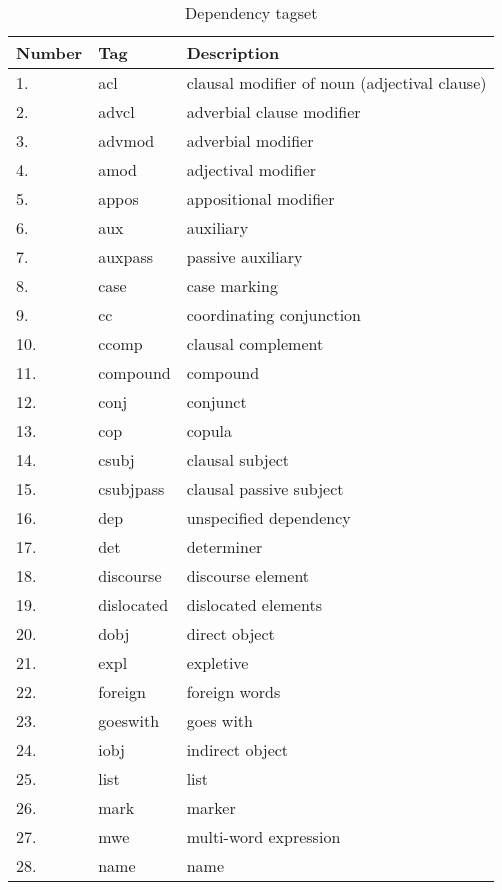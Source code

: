 \begin{table}[h]
	\centering
	      \caption{Dependency tagset}
     \label{table:AllDependencyTags}
    \begin{tabular}{| l | l | l |}
    \hline
    Number & Tag & Description \\ \hline
	\hline
1. & 	acl  & clausal modifier of noun (adjectival clause) \\ \hline
2. &    advcl  & adverbial clause modifier\\ \hline
3. & 	advmod  & adverbial modifier \\ \hline
4. &    amod  & adjectival modifier \\ \hline
5. & 	appos  & appositional modifier \\ \hline
6. & 	aux  & auxiliary \\ \hline
7. &    auxpass  & passive auxiliary \\ \hline
8. & 	case  & case marking \\ \hline
9. & 	cc  & coordinating conjunction \\ \hline
10. &  ccomp  & clausal complement \\ \hline
11. &  compound  & compound \\ \hline
12. & 	conj  & conjunct \\ \hline
13. & 	cop  & copula \\ \hline
14. &  csubj  & clausal subject \\ \hline
15. &  csubjpass  & clausal passive subject \\ \hline
16. &  dep  & unspecified dependency \\ \hline
17. & det  & determiner \\ \hline
18. & discourse  & discourse element \\ \hline
19. &  dislocated  & dislocated elements \\ \hline
20. & 	dobj  & direct object \\ \hline
21. &  expl  & expletive \\ \hline
22. &  foreign  & foreign words \\ \hline
23. &  goeswith  & goes with \\ \hline
24. &  iobj  & indirect object \\ \hline
25. &  list  & list \\ \hline
26. &  mark  & marker \\ \hline
27. &  mwe  & multi-word expression \\ \hline
28. &  name  & name \\ \hline

\end{tabular}
\end{table}
